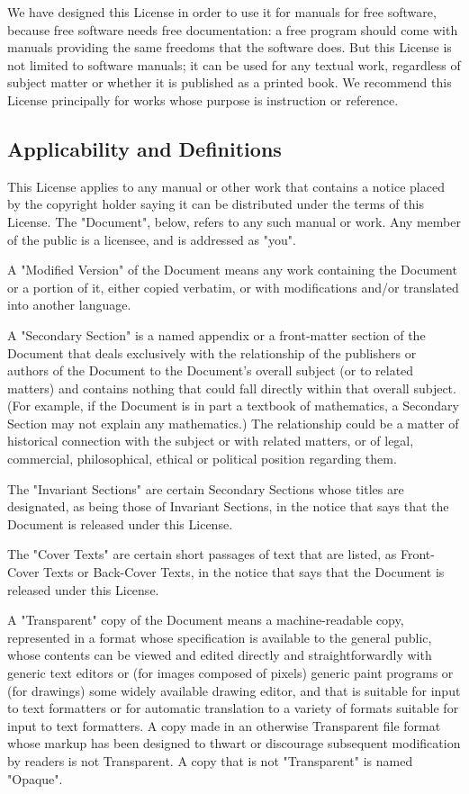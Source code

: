 	We have designed this License in order to use it for manuals for free software, because free software needs free documentation: a free program should come with manuals providing the same freedoms that the software does. But this License is not limited to software manuals; it can be used for any textual work, regardless of subject matter or whether it is published as a printed book. We recommend this License principally for works whose purpose is instruction or reference. 

	\subsection{Applicability and Definitions}
	This License applies to any manual or other work that contains a notice placed by the copyright holder saying it can be distributed under the terms of this License. The "Document", below, refers to any such manual or work. Any member of the public is a licensee, and is addressed as "you". 

	A "Modified Version" of the Document means any work containing the Document or a portion of it, either copied verbatim, or with modifications and/or translated into another language. 

	A "Secondary Section" is a named appendix or a front-matter section of the Document that deals exclusively with the relationship of the publishers or authors of the Document to the Document's overall subject (or to related matters) and contains nothing that could fall directly within that overall subject. (For example, if the Document is in part a textbook of mathematics, a Secondary Section may not explain any mathematics.) The relationship could be a matter of historical connection with the subject or with related matters, or of legal, commercial, philosophical, ethical or political position regarding them. 

	The "Invariant Sections" are certain Secondary Sections whose titles are designated, as being those of Invariant Sections, in the notice that says that the Document is released under this License. 

	The "Cover Texts" are certain short passages of text that are listed, as Front-Cover Texts or Back-Cover Texts, in the notice that says that the Document is released under this License. 

	A "Transparent" copy of the Document means a machine-readable copy, represented in a format whose specification is available to the general public, whose contents can be viewed and edited directly and straightforwardly with generic text editors or (for images composed of pixels) generic paint programs or (for drawings) some widely available drawing editor, and that is suitable for input to text formatters or for automatic translation to a variety of formats suitable for input to text formatters. A copy made in an otherwise Transparent file format whose markup has been designed to thwart or discourage subsequent modification by readers is not Transparent. A copy that is not "Transparent" is named "Opaque". 

